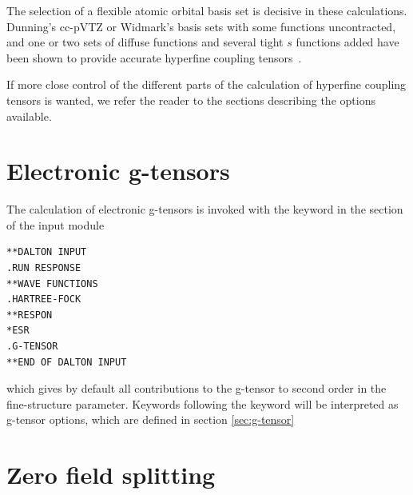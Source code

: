     The selection of a flexible atomic orbital basis set is decisive
in these calculations. Dunning's cc-pVTZ or Widmark's basis sets with some
functions uncontracted, and one or two sets of diffuse functions and
several tight $s$ functions added have been shown to provide accurate
hyperfine coupling tensors~\cite{bfpjcpl232}.

    If more close control of the different parts of the calculation
of hyperfine coupling tensors is wanted, we refer the reader to the
sections describing the options available.

\section{Electronic g-tensors}

\begin{center}
\end{center}

The calculation of electronic g-tensors is invoked
with the keyword  in the
 section of the  input module

\begin{verbatim}
**DALTON INPUT
.RUN RESPONSE
**WAVE FUNCTIONS
.HARTREE-FOCK
**RESPON
*ESR
.G-TENSOR
**END OF DALTON INPUT
\end{verbatim}
which gives by default all contributions to the g-tensor to second order in
the fine-structure parameter. Keywords following the  keyword
will be interpreted as g-tensor options, which are defined in section
\ref{sec:g-tensor}

\section{Zero field splitting}


